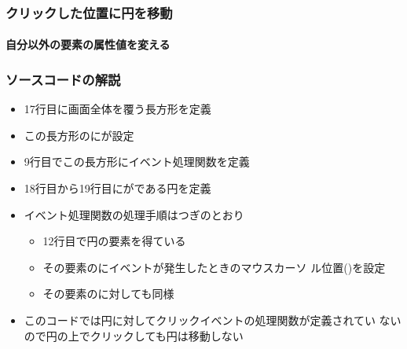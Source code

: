 

\frame{\maketitle}
\begin{frame}[containsverbatim]
 \frametitle{クリックした位置に円を移動}
 \framesubtitle{自分以外の要素の属性値を変える}
\end{frame}
\begin{frame}[containsverbatim]
 \frametitle{ソースコードの解説}
 \begin{itemize}
  \item 17行目に画面全体を覆う長方形を定義
  \item この長方形のにが設定
  \item 9行目でこの長方形にイベント処理関数を定義
  \item 18行目から19行目にがである円を定義
  \item イベント処理関数の処理手順はつぎのとおり
        \begin{itemize}
         \item 12行目で円の要素を得ている
         \item その要素のにイベントが発生したときのマウスカーソ
               ル位置()を設定
         \item その要素のに対しても同様
        \end{itemize}
  \item このコードでは円に対してクリックイベントの処理関数が定義されてい
        ないので円の上でクリックしても円は移動しない
 \end{itemize}
\end{frame}
